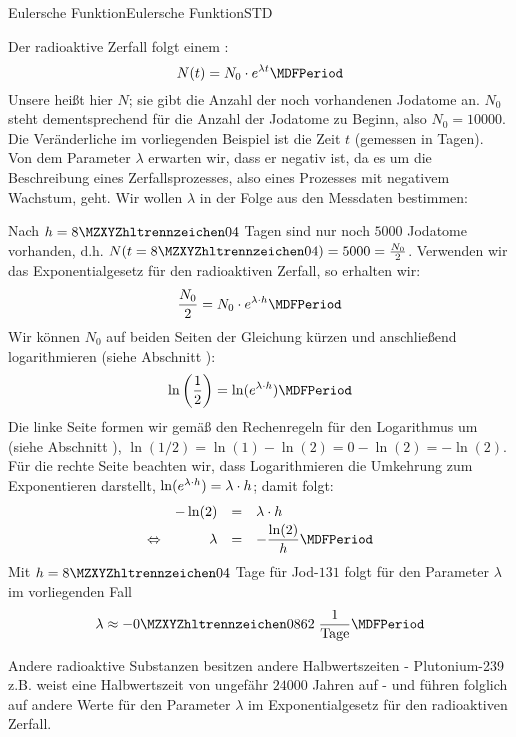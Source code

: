 \begin{MXContent}{Eulersche Funktion}{Eulersche Funktion}{STD}
\begin{MExample}
  Der radioaktive Zerfall folgt einem :
  $$N(t) = N_0 \cdot \MEU^{\lambda t} \MDFPeriod$$
  Unsere  heißt hier $N$; sie gibt die Anzahl der noch vorhandenen Jodatome an. $N_0$
  steht dementsprechend für die Anzahl der Jodatome zu Beginn, also $N_0 = 10000$. Die Veränderliche im vorliegenden
  Beispiel ist die Zeit $t$ (gemessen in Tagen). Von dem Parameter $\lambda$ erwarten wir, dass er negativ ist,
  da es um die Beschreibung eines Zerfallsprozesses, also eines Prozesses mit negativem Wachstum, geht. Wir wollen
  $\lambda$ in der Folge aus den Messdaten bestimmen:
  
  Nach $h = \MZahl{8}{04}$ Tagen sind nur noch $5000$ Jodatome vorhanden, d.h. $N(t = \MZahl{8}{04}) = 5000 = \Mtfrac{N_0}{2}$.
  Verwenden wir das Exponentialgesetz für den radioaktiven Zerfall, so erhalten wir:
  $$\Mdfrac{N_0}{2} = N_0 \cdot \MEU^{\lambda \cdot h}  \MDFPeriod$$
  Wir können $N_0$ auf beiden Seiten der Gleichung kürzen und anschließend logarithmieren (siehe Abschnitt
  ):
  $$\ln \left( \Mdfrac12 \right ) = \ln(\MEU^{\lambda \cdot h})  \MDFPeriod$$
  Die linke Seite formen wir gemäß den Rechenregeln für den Logarithmus um (siehe Abschnitt ),
  $\ln(1/2) = \ln(1) - \ln(2) = 0 - \ln(2) = - \ln(2)$. Für die rechte Seite beachten
  wir, dass Logarithmieren die Umkehrung zum Exponentieren darstellt, $\ln(e^{\lambda \cdot h}) = \lambda \cdot h$;
  damit folgt:
  $$\begin{array}{crcl} & - \ln(2) & = & \lambda \cdot h \\[.5ex]
  \Leftrightarrow & \lambda & = & - \Mdfrac{\ln(2)}{h}  \MDFPeriod \end{array}$$
  Mit $h = \MZahl{8}{04}$ Tage für Jod-$131$ folgt für den Parameter $\lambda$ im vorliegenden Fall
  $$\lambda \approx - \MZahl{0}{0862} \; \Mdfrac{1}{\text{Tage}}  \MDFPeriod$$
  
  Andere radioaktive Substanzen besitzen andere Halbwertszeiten - Plutonium-239 z.B. weist eine Halbwertszeit
  von ungefähr $24000$ Jahren auf - und führen folglich auf andere Werte für den Parameter $\lambda$ im
  Exponentialgesetz für den radioaktiven Zerfall.
 \end{MExample}
\end{MXContent}



